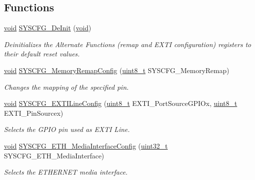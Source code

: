 \subsection*{Functions}
\begin{DoxyCompactItemize}
\item 
\hyperlink{group___n_a_m_e_ga18028b8badbf1ea7e704ccac3c488e82}{void} \hyperlink{group___s_y_s_c_f_g___private___functions_gaf2f9faa2df9a59a68ae17fae23bc478e}{S\-Y\-S\-C\-F\-G\-\_\-\-De\-Init} (\hyperlink{group___n_a_m_e_ga18028b8badbf1ea7e704ccac3c488e82}{void})
\begin{DoxyCompactList}\small\item\em Deinitializes the Alternate Functions (remap and E\-X\-T\-I configuration) registers to their default reset values. \end{DoxyCompactList}\item 
\hyperlink{group___n_a_m_e_ga18028b8badbf1ea7e704ccac3c488e82}{void} \hyperlink{group___s_y_s_c_f_g___private___functions_ga09a5712f6c66ba5f0e0eeba30bc1e20d}{S\-Y\-S\-C\-F\-G\-\_\-\-Memory\-Remap\-Config} (\hyperlink{stdint_8h_aba7bc1797add20fe3efdf37ced1182c5}{uint8\-\_\-t} S\-Y\-S\-C\-F\-G\-\_\-\-Memory\-Remap)
\begin{DoxyCompactList}\small\item\em Changes the mapping of the specified pin. \end{DoxyCompactList}\item 
\hyperlink{group___n_a_m_e_ga18028b8badbf1ea7e704ccac3c488e82}{void} \hyperlink{group___s_y_s_c_f_g___private___functions_gafedab1f64cef720aeafeafd409ba6ae7}{S\-Y\-S\-C\-F\-G\-\_\-\-E\-X\-T\-I\-Line\-Config} (\hyperlink{stdint_8h_aba7bc1797add20fe3efdf37ced1182c5}{uint8\-\_\-t} E\-X\-T\-I\-\_\-\-Port\-Source\-G\-P\-I\-Ox, \hyperlink{stdint_8h_aba7bc1797add20fe3efdf37ced1182c5}{uint8\-\_\-t} E\-X\-T\-I\-\_\-\-Pin\-Sourcex)
\begin{DoxyCompactList}\small\item\em Selects the G\-P\-I\-O pin used as E\-X\-T\-I Line. \end{DoxyCompactList}\item 
\hyperlink{group___n_a_m_e_ga18028b8badbf1ea7e704ccac3c488e82}{void} \hyperlink{group___s_y_s_c_f_g___private___functions_gabec494266ebbbde0279ad1d16c3065d0}{S\-Y\-S\-C\-F\-G\-\_\-\-E\-T\-H\-\_\-\-Media\-Interface\-Config} (\hyperlink{stdint_8h_a435d1572bf3f880d55459d9805097f62}{uint32\-\_\-t} S\-Y\-S\-C\-F\-G\-\_\-\-E\-T\-H\-\_\-\-Media\-Interface)
\begin{DoxyCompactList}\small\item\em Selects the E\-T\-H\-E\-R\-N\-E\-T media interface. \end{DoxyCompactList}\item 

\end{DoxyCompactItemize}
